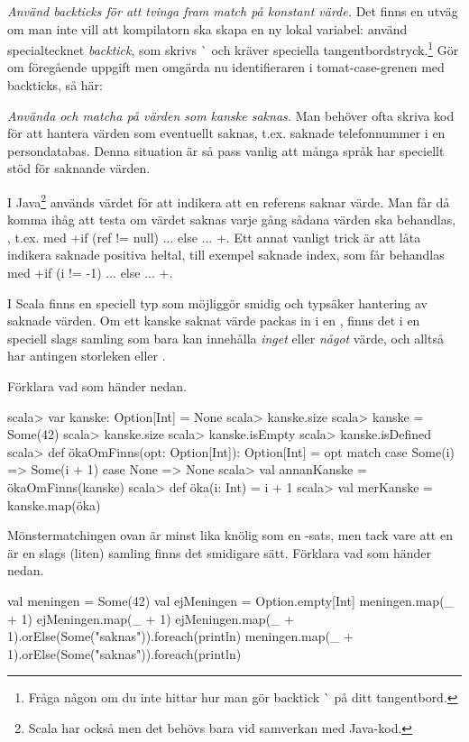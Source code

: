 \Subtask \emph{Använd backticks för att tvinga fram match på konstant värde.} Det finns en utväg om man inte vill att kompilatorn ska skapa en ny lokal variabel: använd specialtecknet \emph{backtick}, som skrivs \`{} och kräver speciella tangentbordstryck.\footnote{Fråga någon om du inte hittar hur man gör backtick \`{} på ditt tangentbord.}  Gör om föregående uppgift men omgärda nu identifieraren  i tomat-case-grenen med backticks, så här: 



\Task \emph{Använda  och matcha på värden som kanske saknas.} Man behöver ofta skriva kod för att hantera värden som eventuellt saknas, t.ex. saknade telefonnummer i en persondatabas. Denna situation är så pass vanlig att många språk har speciellt stöd för saknande värden. 

I Java\footnote{Scala har också  men det behövs bara vid samverkan med Java-kod.} används värdet  för att indikera att en referens saknar värde. Man får då komma ihåg att testa om värdet saknas varje gång sådana värden ska behandlas, , t.ex. med  \code+if (ref != null) { ...} else { ... }+. Ett annat vanligt trick är att låta  indikera saknade positiva heltal, till exempel saknade index, som får behandlas med \code+if (i != -1) { ...} else { ... }+. 

I Scala finns en speciell typ  som möjliggör smidig och typsäker hantering av saknade värden. Om ett kanske saknat värde packas in i en  , finns det i en speciell slags samling som bara kan innehålla \emph{inget} eller \emph{något} värde, och alltså har antingen storleken  eller .    

\Subtask Förklara vad som händer nedan.
\begin{REPL}
scala> var kanske: Option[Int] = None
scala> kanske.size
scala> kanske = Some(42)
scala> kanske.size
scala> kanske.isEmpty
scala> kanske.isDefined
scala> def ökaOmFinns(opt: Option[Int]): Option[Int] = opt match {
         case Some(i) => Some(i + 1)
         case None    => None
       }
scala> val annanKanske = ökaOmFinns(kanske)
scala> def öka(i: Int) = i + 1       
scala> val merKanske = kanske.map(öka)       
\end{REPL}

\Subtask Mönstermatchingen ovan är minst lika knölig som en -sats, men tack vare att en  är en slags (liten) samling finns det smidigare sätt. Förklara vad som händer nedan.
\begin{REPL}
val meningen = Some(42)
val ejMeningen = Option.empty[Int]
meningen.map(_ + 1)
ejMeningen.map(_ + 1)
ejMeningen.map(_ + 1).orElse(Some("saknas")).foreach(println)
meningen.map(_ + 1).orElse(Some("saknas")).foreach(println)
\end{REPL}

